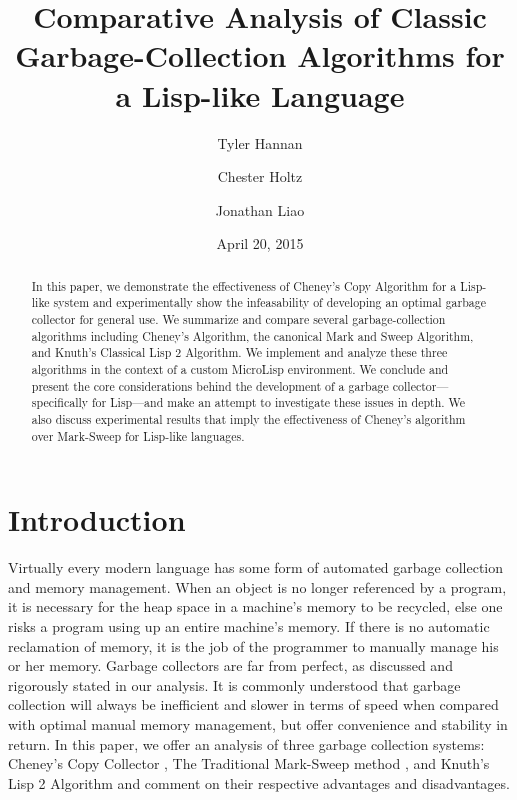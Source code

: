 \documentclass[11pt,leqno]{article}
\title{Comparative Analysis of Classic Garbage-Collection Algorithms for a Lisp-like Language}
\author{Tyler Hannan}
\author{Chester Holtz}
\author{Jonathan Liao}
\affil{Department of Computer Science\\University of Rochester\\Rochester, NY 14627, USA}
\date{April 20, 2015}
\begin{document}
\sloppy

{
\singlespacing
\maketitle
}

\begin{abstract}
\noindent In this paper, we demonstrate the effectiveness of Cheney's Copy Algorithm for a Lisp-like system and experimentally show the infeasability of developing an optimal garbage collector for general use. We summarize and compare several garbage-collection algorithms including Cheney's Algorithm, the canonical Mark and Sweep Algorithm, and Knuth's Classical Lisp 2 Algorithm. We implement and analyze these three algorithms in the context of a custom MicroLisp environment. We conclude and present the core considerations behind the development of a garbage collector---specifically for Lisp---and make an attempt to investigate these issues in depth. We also discuss experimental results that imply the effectiveness of Cheney's algorithm over Mark-Sweep for Lisp-like languages.
\end{abstract}

\section{Introduction}

Virtually every modern language has some form of automated garbage collection and memory management. When an object is no longer referenced by a program, it is necessary for the heap space in a machine's memory to be recycled, else one risks a program using up an entire machine's memory. If there is no automatic reclamation of memory, it is the job of the programmer to manually manage his or her memory. Garbage collectors are far from perfect, as discussed and rigorously stated in our analysis. It is commonly understood that garbage collection will always be inefficient and slower in terms of speed when compared with optimal manual memory management, but offer convenience and stability in return.  In this paper, we offer an analysis of three garbage collection systems: Cheney's Copy Collector \cite{hanappe}, The Traditional Mark-Sweep method \cite{fenichel}, and Knuth's Lisp 2 Algorithm \cite{knuth3} and comment on their respective advantages and disadvantages.
\end{document}

